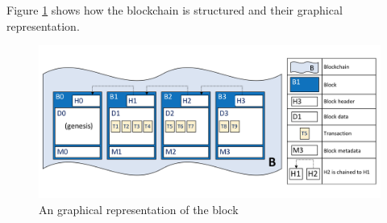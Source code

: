 \documentclass[a4paper,11pt]{report}
\begin{document}
Figure \ref{fabricBlock} shows how the blockchain is structured and their graphical representation. 

\begin{figure}[h]
\centering
  \includegraphics[width=16cm]{ledgerdiagram2.png}
  \caption{An graphical representation of the block \cite{fabledger}}
  \label{fabricBlock}
\end{figure}
\end{document}

